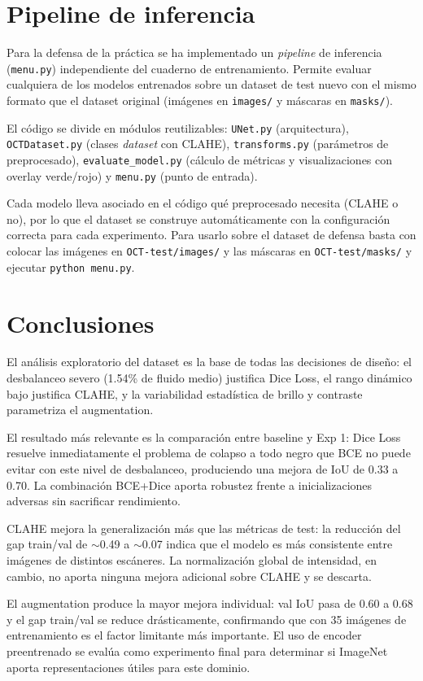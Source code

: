 \documentclass[12pt,a4paper]{article}
\begin{document}
\section{Pipeline de inferencia}

Para la defensa de la práctica se ha implementado un \textit{pipeline} de inferencia (\texttt{menu.py}) independiente del cuaderno de entrenamiento. Permite evaluar cualquiera de los modelos entrenados sobre un dataset de test nuevo con el mismo formato que el dataset original (imágenes en \texttt{images/} y máscaras en \texttt{masks/}).

El código se divide en módulos reutilizables: \texttt{UNet.py} (arquitectura), \texttt{OCTDataset.py} (clases \textit{dataset} con CLAHE), \texttt{transforms.py} (parámetros de preprocesado), \texttt{evaluate\_model.py} (cálculo de métricas y visualizaciones con overlay verde/rojo) y \texttt{menu.py} (punto de entrada).

Cada modelo lleva asociado en el código qué preprocesado necesita (CLAHE o no), por lo que el dataset se construye automáticamente con la configuración correcta para cada experimento. Para usarlo sobre el dataset de defensa basta con colocar las imágenes en \texttt{OCT-test/images/} y las máscaras en \texttt{OCT-test/masks/} y ejecutar \texttt{python menu.py}.

\section{Conclusiones}

El análisis exploratorio del dataset es la base de todas las decisiones de diseño: el desbalanceo severo (1.54\% de fluido medio) justifica Dice Loss, el rango dinámico bajo justifica CLAHE, y la variabilidad estadística de brillo y contraste parametriza el augmentation.

El resultado más relevante es la comparación entre baseline y Exp 1: Dice Loss resuelve inmediatamente el problema de colapso a todo negro que BCE no puede evitar con este nivel de desbalanceo, produciendo una mejora de IoU de 0.33 a 0.70. La combinación BCE+Dice aporta robustez frente a inicializaciones adversas sin sacrificar rendimiento.

CLAHE mejora la generalización más que las métricas de test: la reducción del gap train/val de $\sim$0.49 a $\sim$0.07 indica que el modelo es más consistente entre imágenes de distintos escáneres. La normalización global de intensidad, en cambio, no aporta ninguna mejora adicional sobre CLAHE y se descarta.

El augmentation produce la mayor mejora individual: val IoU pasa de 0.60 a 0.68 y el gap train/val se reduce drásticamente, confirmando que con 35 imágenes de entrenamiento es el factor limitante más importante. El uso de encoder preentrenado se evalúa como experimento final para determinar si ImageNet aporta representaciones útiles para este dominio.
\end{document}
